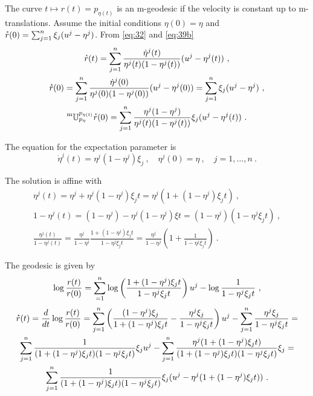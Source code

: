 \documentclass[12pt,a4paper]{amsart}
\begin{document}
The curve $t \mapsto r(t) = p_{\eta(t)}$ is an m-geodesic if the velocity is constant up to m-translations. Assume the initial conditions $\eta(0) = \eta$ and $\accentset{\star}{r}(0) = \sum_{j=1}^n \xi_j(u^j - \eta^j)$. From \cref{eq:32} and \cref{eq:39b}
\begin{gather}
  \label{eq:40}
  \accentset{\star}{r}(t) =  \sum_{j=1}^n \frac{\dot \eta^j(t)}{\eta^j(t)(1 - \eta^j(t))} (u^j - \eta^j(t)) \ , \\
  \accentset{\star}{r}(0) =  \sum_{j=1}^n \frac{\dot \eta^j(0)}{\eta^j(0)(1 - \eta^j(0))} (u^j - \eta^j(0)) = \sum_{j=1}^n \xi_j(u^j - \eta^j) \ , \\
\prescript{\text{m}}{} {\mathbb U} _ {p_{\eta}} ^ {p_{\eta(t)}} \accentset{\star}{r}(0) =  \sum_{j=1}^n \frac{\eta^j(1-\eta^j)} {\eta^j(t)(1-\eta^j(t))} \xi_j (u^j - \eta^j(t)) \ .
\end{gather}

The equation for the expectation parameter is
\begin{equation}
  \label{eq:41}
  \dot \eta^j(t) = \eta^j(1-\eta^j) \xi_j \ , \quad \eta^j(0) = \eta \ , \quad j = 1,\dots,n \ .
\end{equation}

The solution is affine with
\begin{gather}
  \label{eq:44}
  \eta^j(t) = \eta^j + \eta^j(1-\eta^j) \xi_j t = \eta^j\left (1 + (1-\eta^j) \xi_j t\right) \ ,\\
  1 - \eta^j(t) = (1 - \eta^j) - \eta^j(1-\eta^j) \xi t = (1 - \eta^j)(1 -\eta^j\xi_j t) \ , \\
  \frac{\eta^j(t)}{1-\eta^j(t)} = \frac{\eta^j}{1-\eta^j} \frac{1 + (1-\eta^j) \xi_j t}{1 -\eta^j\xi_j t} = \frac{\eta^j}{1-\eta^j} \left(1 + \frac{1}{1 -\eta^j\xi_j t}\right) \ .
\end{gather}

The geodesic is given by 
\begin{equation}
  \label{eq:42}
  \log \frac{r(t)}{r(0)} = \sum_{=1}^n \log\left(\frac{1 + (1-\eta^j) \xi_j t}{1 -\eta^j\xi_j t}\right) u^j - \log \frac1{1 -\eta^j\xi_j t} \ ,
\end{equation}
\begin{multline}
  \accentset{\star}{r}(t) = \frac{d}{dt} \log \frac{r(t)}{r(0)} = \sum_{j=1}^n \left(\frac{(1 -\eta^j)\xi_j}{1 + (1-\eta^j) \xi_j t} - \frac{\eta^j\xi_j}{1 - \eta^j \xi_j t} \right) u^j - \sum_{j=1}^n \frac{\eta^j\xi_j}{1-\eta^j\xi_jt} = \\
  \sum_{j=1}^n \frac{1}{(1 + (1-\eta^j) \xi_j t)(1 - \eta^j \xi_j t)} \xi_j u^j 
- \sum_{j=1}^n \frac{\eta^j(1 + (1-\eta^j) \xi_j t)}{(1 + (1-\eta^j) \xi_j t)(1 - \eta^j \xi_j t)} \xi_j  = \\
 \sum_{j=1}^n \frac{1}{(1 + (1-\eta^j) \xi_j t)(1 - \eta^j \xi_j t)} \xi_j (u^j - \eta^j(1 + (1-\eta^j) \xi_j t)) \ . \end{multline}
\end{document}
